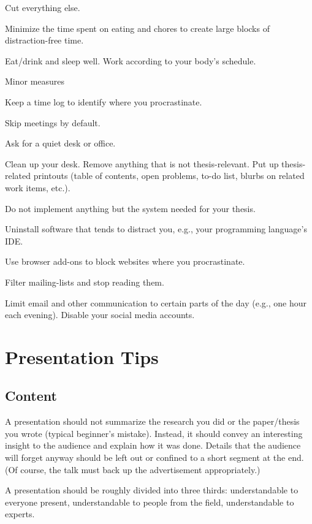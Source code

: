 \documentclass[12pt]{article}
\begin{document}
\begin{compactitem}
\begin{compactitem}
Cut everything else.
\item Minimize the time spent on eating and chores to create large blocks of distraction-free time.
\item Eat/drink and sleep well. Work according to your body's schedule.
\end{compactitem}
\item Minor measures
\begin{compactitem}
\item Keep a time log to identify where you procrastinate.
\item Skip meetings by default.
\item Ask for a quiet desk or office.
\item Clean up your desk. Remove anything that is not thesis-relevant. Put up thesis-related printouts (table of contents, open problems, to-do list, blurbs on related work items, etc.).
\item Do not implement anything but the system needed for your thesis.
\item Uninstall software that tends to distract you, e.g., your programming language's IDE.
\item Use browser add-ons to block websites where you procrastinate.
\item Filter mailing-lists and stop reading them.
\item Limit email and other communication to certain parts of the day (e.g., one hour each evening).
Disable your social media accounts.
\end{compactitem}
\end{compactitem}

\section{Presentation Tips}

\subsection{Content}

A presentation should not summarize the research you did or the paper/thesis you wrote (typical beginner's mistake).
Instead, it should convey an interesting insight to the audience and explain how it was done.
Details that the audience will forget anyway should be left out or confined to a short segment at the end.
(Of course, the talk must back up the advertisement appropriately.)
\medskip

A presentation should be roughly divided into three thirds: understandable to everyone present, understandable to people from the field, understandable to experts.
\medskip
\end{document}
